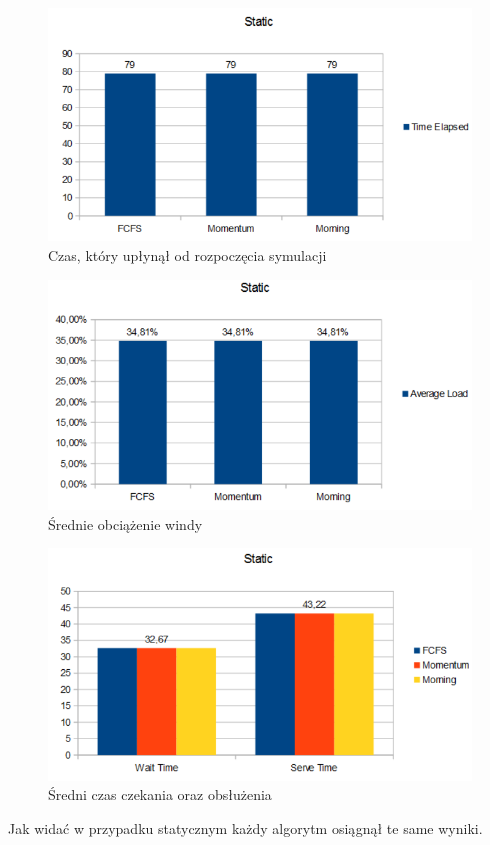 \documentclass[a4paper,11pt]{article}
\begin{document}
\begin{figure}[H]
    \centering
    \caption{Czas, który upłynął od rozpoczęcia symulacji}
    \includegraphics[width=\textwidth]{s_elapsed.png}
\end{figure}

\begin{figure}[H]
    \centering
    \caption{Średnie obciążenie windy}
    \includegraphics[width=\textwidth]{s_load.png}
\end{figure}

\begin{figure}[H]
    \centering
    \caption{Średni czas czekania oraz obsłużenia}
    \includegraphics[width=\textwidth]{s_time.png}
\end{figure}
\noindent
Jak widać w przypadku statycznym każdy algorytm osiągnął te same wyniki.
\end{document}
